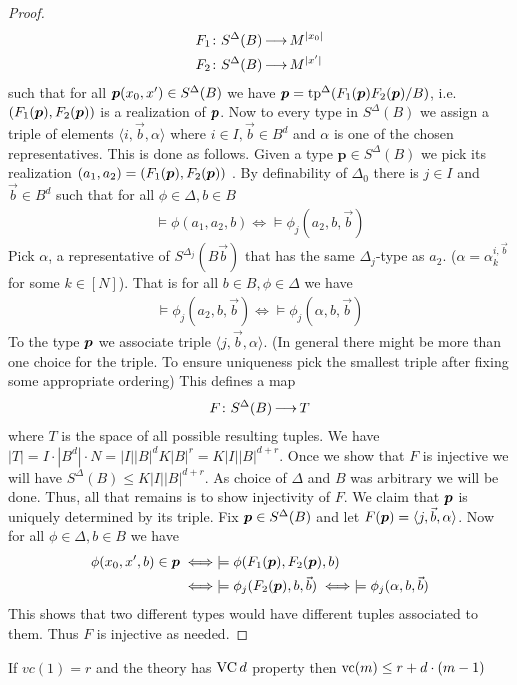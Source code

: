 \documentclass{amsart}
\newcommand{\D}{\Delta}
\begin{document}
\begin{proof}
\begin{align*}
		F_1 &\colon S^\D(B) \arr M^{|x_0|} \\
		F_2 &\colon S^\D(B) \arr M^{|x'|}
	\end{align*}
	such that for all $\pp(x_0, x') \in S^\D(B)$ we have $\pp = \tp^\D(F_1(\pp)F_2(\pp) / B)$, i.e. $(F_1(\operatorname{\boldsymbol p}), F_2(\operatorname{\boldsymbol p}))$ is a realization of $\operatorname{\boldsymbol p}$. Now to every type in $S^\D(B)$ we assign a triple of elements $\langle i, \vec b, \alpha \rangle$ where $i \in I, \vec b \in B^d$ and $\alpha$ is one of the chosen representatives. This is done as follows. Given a type $\boldsymbol p \in S^\D(B)$ we pick its realization $(a_1, a_2) = (F_1(\operatorname{\boldsymbol p}), F_2(\operatorname{\boldsymbol p}))$ . By definability of $\D_0$ there is $j \in I$ and $\vec b \in B^d$ such that for all $\phi \in \D, b \in B$
	\begin{align*}
		\models \phi(a_1, a_2, b) \iff \models \phi_j(a_2, b, \vec b)
	\end{align*}
	Pick $\alpha$, a representative of $S^{\D_j}(B\vec b)$ that has the same $\D_j$-type as $a_2$. ($\alpha = \alpha^{i, \vec b}_k$ for some $k \in [N]$). That is for all $b \in B, \phi \in \D$ we have
	\begin{align*}
		\models \phi_j(a_2, b, \vec b) \iff \models \phi_j(\alpha, b, \vec b)
	\end{align*}
	To the type $\operatorname{\boldsymbol p}$ we associate triple $\langle j, \vec b, \alpha\rangle$. (In general there might be more than one choice for the triple. To ensure uniqueness pick the smallest triple after fixing some appropriate ordering) This defines a map
	\begin{align*}
		F \colon S^\D(B) \arr T
	\end{align*}
	where $T$ is the space of all possible resulting tuples. We have $|T| = I \cdot |B^d| \cdot N = |I||B|^dK|B|^r= K|I||B|^{d + r}$. Once we show that $F$ is injective we will have $S^\D(B) \leq K|I||B|^{d + r}$. As choice of $\D$ and $B$ was arbitrary we will be done. Thus, all that remains is to show injectivity of $F$. We claim that $\operatorname{\boldsymbol p}$ is uniquely determined by its triple. Fix $\pp \in S^\D(B)$ and let $F(\operatorname{\boldsymbol p}) = \langle j, \vec b, \alpha\rangle$. Now for all $\phi \in \D, b \in B$ we have
	\begin{align*}
		\phi(x_0, x', b) \in \operatorname{\boldsymbol p} &\iff \models \phi(F_1(\operatorname{\boldsymbol p}), F_2(\operatorname{\boldsymbol p}), b) \\
		&\iff \models \phi_j(F_2(\operatorname{\boldsymbol p}), b, \vec b) \iff \models \phi_j(\alpha, b, \vec b)
	\end{align*}
	This shows that two different types would have different tuples associated to them. Thus $F$ is injective as needed.
\end{proof}
\begin{Corollary}
	If $vc(1) = r$ and the theory has $\operatorname{VC} d$ property then $\operatorname{vc}(m) \leq r + d \cdot (m - 1)$
\end{Corollary}
\end{document}

